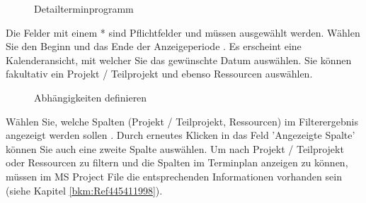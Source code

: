 \begin{figure}[H]
\caption{Detailterminprogramm}
\end{figure}

Die Felder mit einem * sind Pflichtfelder und müssen ausgewählt werden. Wählen Sie den Beginn und das Ende der Anzeigeperiode . Es erscheint eine Kalenderansicht, mit welcher Sie das gewünschte Datum auswählen. Sie können fakultativ ein Projekt / Teilprojekt  und ebenso Ressourcen  auswählen.

\begin{figure}[H]
\caption{Abhängigkeiten definieren}
\end{figure}


Wählen Sie, welche Spalten (Projekt / Teilprojekt, Ressourcen) im Filterergebnis angezeigt werden sollen . Durch erneutes Klicken in das Feld 'Angezeigte Spalte' können Sie auch eine zweite Spalte auswählen. Um nach Projekt / Teilprojekt oder Ressourcen zu filtern und die Spalten im Terminplan anzeigen zu können, müssen im MS Project File die entsprechenden Informationen vorhanden sein (siehe Kapitel \ref{bkm:Ref445411998}).

